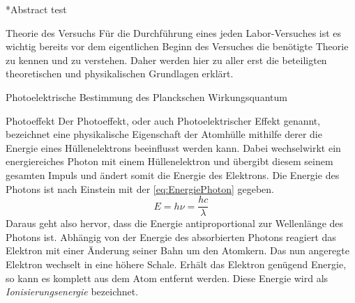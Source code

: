 \documentclass[pdftex, a4paper,11pt, twoside, ngerman]{report}
\begin{document}
  
  
  \begin{chapter}*{Abstract}
    test
  \end{chapter}
  
  \tableofcontents
  
  
  
  \begin{chapter}{Theorie des Versuchs}
    \label{chp:Theorie}
    Für die Durchführung eines jeden Labor-Versuches ist es wichtig bereits vor dem eigentlichen Beginn des Versuches die benötigte Theorie zu kennen und zu verstehen. Daher werden hier zu aller erst die beteiligten theoretischen und physikalischen Grundlagen erklärt.
    
    
    
    \begin{section}{Photoelektrische Bestimmung des Planckschen Wirkungsquantum}
      \label{chp:TheoriePhotoelektrischesWirkungsquantum}
      
      
      
      \begin{subsection}{Photoeffekt}
	\label{chp:TheoriePhotoelektrischesWirkungsquantumPhotoeffekt}
	Der Photoeffekt, oder auch Photoelektrischer Effekt genannt, bezeichnet eine physikalische Eigenschaft der Atomhülle mithilfe derer die Energie eines Hüllenelektrons beeinflusst werden kann. Dabei wechselwirkt ein energiereiches Photon mit einem Hüllenelektron und übergibt diesem seinem gesamten Impuls und ändert somit die Energie des Elektrons. Die Energie des Photons ist nach Einstein mit der \cref{eq:EnergiePhoton} gegeben.
	\begin{equation}
	  \label{eq:EnergiePhoton}
	  E=h\nu=\frac{hc}{\lambda}
	\end{equation}
	Daraus geht also hervor, dass die Energie antiproportional zur Wellenlänge des Photons ist. Abhängig von der Energie des absorbierten Photons reagiert das Elektron mit einer Änderung seiner Bahn um den Atomkern. Das nun angeregte Elektron wechselt in eine höhere Schale. Erhält das Elektron genügend Energie, so kann es komplett aus dem Atom entfernt werden. Diese Energie wird als \textit{Ionisierungsenergie} bezeichnet.
	

\end{subsection}
\end{section}
\end{chapter}
\end{document}
